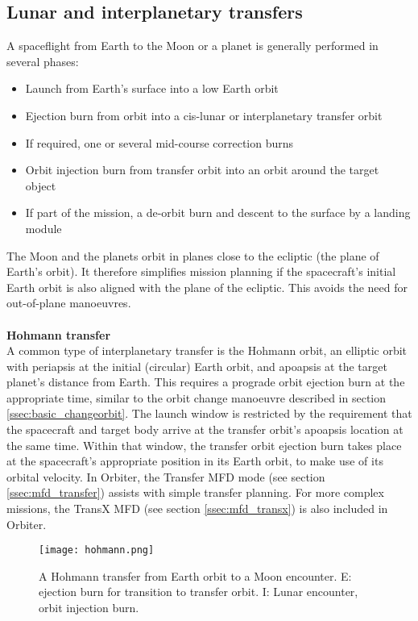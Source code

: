 \documentclass[Orbiter User Manual.tex]{subfiles}
\begin{document}
\subsection{Lunar and interplanetary transfers}
A spaceflight from Earth to the Moon or a planet is generally performed in several phases:

\begin{itemize}
\item Launch from Earth's surface into a low Earth orbit
\item Ejection burn from orbit into a cis-lunar or interplanetary transfer orbit
\item If required, one or several mid-course correction burns
\item Orbit injection burn from transfer orbit into an orbit around the target object
\item If part of the mission, a de-orbit burn and descent to the surface by a landing module
\end{itemize}

\noindent
The Moon and the planets orbit in planes close to the ecliptic (the plane of Earth's orbit). It therefore simplifies mission planning if the spacecraft's initial Earth orbit is also aligned with the plane of the ecliptic. This avoids the need for out-of-plane manoeuvres.\\
\\
\textbf{Hohmann transfer}\\
A common type of interplanetary transfer is the Hohmann orbit, an elliptic orbit with periapsis at the initial (circular) Earth orbit, and apoapsis at the target planet's distance from Earth. This requires a prograde orbit ejection burn at the appropriate time, similar to the orbit change manoeuvre described in section \ref{ssec:basic_changeorbit}. The launch window is restricted by the requirement that the spacecraft and target body arrive at the transfer orbit's apoapsis location at the same time. Within that window, the transfer orbit ejection burn takes place at the spacecraft's appropriate position in its Earth orbit, to make use of its orbital velocity. In Orbiter, the Transfer MFD mode (see section \ref{ssec:mfd_transfer}) assists with simple transfer planning. For more complex missions, the TransX MFD (see section \ref{ssec:mfd_transx}) is also included in Orbiter.


\begin{figure}[H]
	\centering
	\texttt{[image: hohmann.png]}
	\caption{A Hohmann transfer from Earth orbit to a Moon encounter. E: ejection burn for transition to transfer orbit. I: Lunar encounter, orbit injection burn.}
\end{figure}
\end{document}

